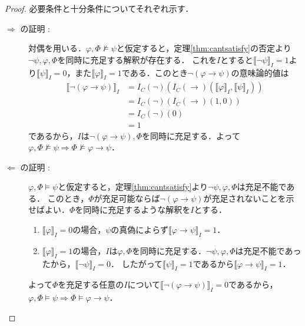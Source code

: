 \documentclass[uplatex,a4paper,dvipdfmx]{jsarticle}
\newcommand{\semvalue}[1]{\llbracket {#1} \rrbracket}
\theoremstyle{definition}
\begin{document}
                \begin{proof} 必要条件と十分条件についてそれぞれ示す．
                    \begin{description}
                        \item[$\Rightarrow$ の証明 : ] 対偶を用いる．$\varphi, \Phi \not\vDash \psi$と仮定すると，定理\ref{thm:cantsatisfy}の否定より$\lnot\psi, \varphi, \Phi$を同時に充足する解釈が存在する．
                            これを$I$とすると$\semvalue{\lnot\psi}_I = 1$より$\semvalue{\psi}_I = 0$，また$\semvalue{\varphi}_I = 1$である．このとき$\lnot(\varphi \to \psi)$の意味論的値は
                            \begin{align*}
                                \semvalue{\lnot(\varphi \to \psi)}_I &= I_C(\lnot)(I_C(\to)(\semvalue{\varphi}_I, \semvalue{\psi}_I)) \\
                                    &= I_C(\lnot)(I_C(\to)(1, 0)) \\
                                    &= I_C(\lnot)(0) \\
                                    &= 1
                            \end{align*}
                            であるから，$I$は$\lnot(\varphi \to \psi), \Phi$を同時に充足する．よって$\varphi, \Phi \not\vDash \psi \Longrightarrow \Phi \not\vDash \varphi \to \psi$．
                        \item[$\Leftarrow$ の証明 : ] $\varphi, \Phi \vDash \psi$と仮定すると，定理\ref{thm:cantsatisfy}より$\lnot\psi, \varphi, \Phi$は充足不能である．
                            このとき，$\Phi$が充足可能ならば$\lnot(\varphi \to \psi)$が充足されないことを示せばよい．$\Phi$を同時に充足するような解釈を$I$とする．
                            \begin{enumerate}
                                \item $\semvalue{\varphi}_I = 0$の場合，$\psi$の真偽によらず$\semvalue{\varphi \to \psi}_I = 1$．
                                \item $\semvalue{\varphi}_I = 1$の場合，$I$は$\varphi, \Phi$を同時に充足する．$\lnot\psi, \varphi, \Phi$は充足不能であったから，$\semvalue{\lnot\psi}_I = 0$．
                                    したがって$\semvalue{\psi}_I = 1$であるから$\semvalue{\varphi \to \psi}_I = 1$．
                            \end{enumerate}
                            よって$\Phi$を充足する任意の$I$について$\semvalue{\lnot(\varphi \to \psi)}_I = 0$であるから，$\varphi, \Phi \vDash \psi \Longrightarrow \Phi \vDash \varphi \to \psi$．
                    \end{description}
                \end{proof}
\end{document}
